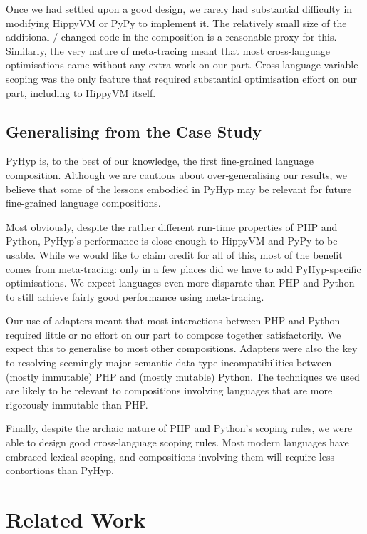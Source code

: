 \documentclass[a4paper,UKenglish]{lipics-v2016}
\newcommand{\ourvm}{PyHyp\xspace}
\newcommand{\hippy}{HippyVM\xspace}
\newcommand{\pypy}{PyPy\xspace}
\begin{document}
Once we had settled upon a good design, we rarely had substantial difficulty in
modifying \hippy or \pypy to implement it. The relatively small size of the
additional / changed code in the composition is a reasonable proxy for this.
Similarly, the very nature of
meta-tracing meant that most cross-language optimisations came without any extra
work on our part. Cross-language variable scoping was the only feature that
required substantial optimisation effort on our part, including to \hippy
itself.


\subsection{Generalising from the Case Study}

\ourvm is, to the best of our knowledge, the first fine-grained language
composition. Although we are cautious about over-generalising our results, we
believe that some of the lessons embodied in \ourvm may be relevant for future
fine-grained language compositions.

Most obviously, despite the rather different run-time properties of PHP and
Python, \ourvm's performance is close enough to \hippy and \pypy to be usable.
While we would like to claim credit for all of this, most of the benefit comes
from meta-tracing: only in a few places did we have to add \ourvm-specific
optimisations. We expect languages even more disparate than PHP and Python
to still achieve fairly good performance using meta-tracing.

Our use of adapters meant that most interactions between PHP and Python required
little or no effort on our part to compose together satisfactorily. We expect
this to generalise to most other compositions. Adapters were also the key to
resolving seemingly major semantic data-type incompatibilities between (mostly
immutable) PHP and (mostly mutable) Python. The techniques we used are likely to
be relevant to compositions involving languages that are more rigorously
immutable than PHP.

Finally, despite the archaic nature of PHP and Python's scoping rules, we were
able to design good cross-language scoping rules. Most modern languages have
embraced lexical scoping, and compositions involving them will require less
contortions than \ourvm.


\section{Related Work}
\label{sec:related}
\end{document}
